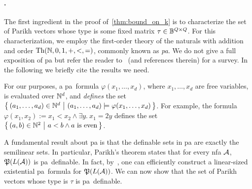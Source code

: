 \paragraph*{.}
The first ingredient in the proof of~\cref{thm:bound_on_k} is to characterize the set of Parikh vectors whose type is some fixed matrix $\tau\in \mathbb{B}^{Q\times Q}$. For this characterization, we employ the first-order theory of the naturals with addition and order $\textrm{Th}(\mathbb{N},0,1,+,<,=)$, commonly known as \emph{\gls{pa}}. We do not give a full exposition of \gls{pa} but refer the reader to~\cite{Haase2018} (and references therein) for a survey. In the following we briefly cite the results we need.

For our purposes, a \gls{pa}~formula $\varphi(x_1,\ldots,x_d)$, where $x_1,\ldots, x_d$ are free variables, is evaluated over $\mathbb{N}^d$, and \emph{defines} the set $\left\{\,(a_1,\ldots,a_d)\in \mathbb{N}^d\ \middle|\ (a_1,\ldots,a_d)\models \varphi(x_1,\ldots,x_d)\,\right\}$. For example, the formula $\varphi(x_1,x_2):=x_1< x_2\wedge \exists y.\ x_1=2y$ defines the set \linebreak $\left\{\,(a,b)\in \mathbb{N}^2\ \middle|\ a<b\wedge a \text{ is even}\,\right\}$.

A fundamental result about \gls{pa} is that the definable sets in \gls{pa} are exactly the semilinear sets. In particular, Parikh's theorem states that for every \gls{nfa} $\mathcal{A}$, $\mathfrak{P}(L(\mathcal{A}))$ is \gls{pa}~definable. In fact, by~\cite{Verma2005}, one can efficiently construct a linear-sized existential \gls{pa}~formula for $\mathfrak{P}(L(\mathcal{A}))$.
We can now show that the set of Parikh vectors whose type is $\tau$ is \gls{pa}~definable.

